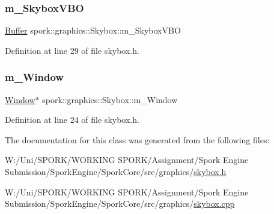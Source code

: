 \mbox{\label{classspork_1_1graphics_1_1_skybox_a5a78f895924872ccfb075255238eab24}} 
\subsubsection{\texorpdfstring{m\+\_\+\+Skybox\+V\+BO}{m\_SkyboxVBO}}
{\footnotesize\ttfamily \hyperlink{classspork_1_1graphics_1_1_buffer}{Buffer} spork\+::graphics\+::\+Skybox\+::m\+\_\+\+Skybox\+V\+BO\hspace{0.3cm}{\ttfamily [private]}}



Definition at line 29 of file skybox.\+h.

\mbox{\label{classspork_1_1graphics_1_1_skybox_aec596e691a2973b70d549bb2feea4da2}} 
\subsubsection{\texorpdfstring{m\+\_\+\+Window}{m\_Window}}
{\footnotesize\ttfamily \hyperlink{classspork_1_1graphics_1_1_window}{Window}$\ast$ spork\+::graphics\+::\+Skybox\+::m\+\_\+\+Window\hspace{0.3cm}{\ttfamily [private]}}



Definition at line 24 of file skybox.\+h.



The documentation for this class was generated from the following files\+:\begin{DoxyCompactItemize}
\item 
W\+:/\+Uni/\+S\+P\+O\+R\+K/\+W\+O\+R\+K\+I\+N\+G S\+P\+O\+R\+K/\+Assignment/\+Spork Engine Submission/\+Spork\+Engine/\+Spork\+Core/src/graphics/\hyperlink{skybox_8h}{skybox.\+h}\item 
W\+:/\+Uni/\+S\+P\+O\+R\+K/\+W\+O\+R\+K\+I\+N\+G S\+P\+O\+R\+K/\+Assignment/\+Spork Engine Submission/\+Spork\+Engine/\+Spork\+Core/src/graphics/\hyperlink{skybox_8cpp}{skybox.\+cpp}\end{DoxyCompactItemize}
